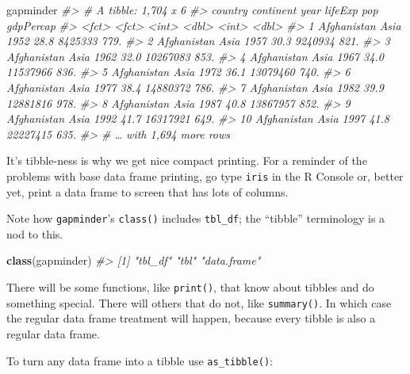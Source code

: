 \documentclass[
]{book}
\newenvironment{Shaded}{\begin{snugshade}}{\end{snugshade}}
\newcommand{\CommentTok}[1]{\textcolor[rgb]{0.56,0.35,0.01}{\textit{#1}}}
\newcommand{\KeywordTok}[1]{\textcolor[rgb]{0.13,0.29,0.53}{\textbf{#1}}}
\newcommand{\NormalTok}[1]{#1}
\begin{document}
\begin{Shaded}
\begin{Highlighting}[]
\NormalTok{gapminder}
\CommentTok{#> # A tibble: 1,704 x 6}
\CommentTok{#>    country     continent  year lifeExp      pop gdpPercap}
\CommentTok{#>    <fct>       <fct>     <int>   <dbl>    <int>     <dbl>}
\CommentTok{#>  1 Afghanistan Asia       1952    28.8  8425333      779.}
\CommentTok{#>  2 Afghanistan Asia       1957    30.3  9240934      821.}
\CommentTok{#>  3 Afghanistan Asia       1962    32.0 10267083      853.}
\CommentTok{#>  4 Afghanistan Asia       1967    34.0 11537966      836.}
\CommentTok{#>  5 Afghanistan Asia       1972    36.1 13079460      740.}
\CommentTok{#>  6 Afghanistan Asia       1977    38.4 14880372      786.}
\CommentTok{#>  7 Afghanistan Asia       1982    39.9 12881816      978.}
\CommentTok{#>  8 Afghanistan Asia       1987    40.8 13867957      852.}
\CommentTok{#>  9 Afghanistan Asia       1992    41.7 16317921      649.}
\CommentTok{#> 10 Afghanistan Asia       1997    41.8 22227415      635.}
\CommentTok{#> # … with 1,694 more rows}
\end{Highlighting}
\end{Shaded}

It's tibble-ness is why we get nice compact printing. For a reminder of the problems with base data frame printing, go type \texttt{iris} in the R Console or, better yet, print a data frame to screen that has lots of columns.

Note how \texttt{gapminder}'s \texttt{class()} includes \texttt{tbl\_df}; the ``tibble'' terminology is a nod to this.

\begin{Shaded}
\begin{Highlighting}[]
\KeywordTok{class}\NormalTok{(gapminder)}
\CommentTok{#> [1] "tbl_df"     "tbl"        "data.frame"}
\end{Highlighting}
\end{Shaded}

There will be some functions, like \texttt{print()}, that know about tibbles and do something special. There will others that do not, like \texttt{summary()}. In which case the regular data frame treatment will happen, because every tibble is also a regular data frame.

To turn any data frame into a tibble use \texttt{as\_tibble()}:
\end{document}
